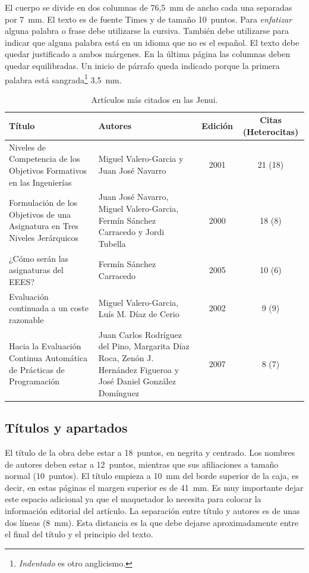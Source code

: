 \documentclass[twocolumn,twoside,a4paper, 10pt]{article}
\begin{document}
El cuerpo se divide en dos columnas de 76,5~mm de ancho cada una 
separadas por 7~mm. El texto es de fuente Times y de tamaño 10~puntos. 
Para \emph{enfatizar} alguna palabra o frase debe utilizarse la 
cursiva. También debe utilizarse para indicar que alguna palabra está 
en un idioma que no es el español. El texto debe quedar justificado a 
ambos márgenes. En la última página las columnas deben quedar 
equilibradas.
Un inicio de párrafo queda indicado porque la primera palabra está
sangrada\footnote{\emph{Indentado} es otro anglicismo.} 3,5~mm.

\begin{table}
	\begin{center}
	\begin{tabular}{p{5.2cm}p{4.5cm}cc}
		\textbf{Título} & \textbf{Autores} & \textbf{Edición} & 
		\textbf{Citas (Heterocitas)}\\\hline
		Niveles de Competencia de los Objetivos Formativos en las 
		Ingenierías & Miguel Valero-Garcia y Juan José Navarro & 2001 
		& 21 (18) \\\hline
		Formulación de los Objetivos de una Asignatura en Tres Niveles
		Jerárquicos & Juan José Navarro, Miguel Valero-Garcia, Fermín
		Sánchez Carracedo y Jordi Tubella & 2000 & 18 (8) \\\hline
		¿Cómo serán las asignaturas del EEES? & Fermín Sánchez
		Carracedo & 2005 & 10 (6) \\\hline
		Evaluación continuada a un coste razonable & Miguel
		Valero-Garcia, Luís M. Díaz de Cerio & 2002 & 9 (9) \\\hline
		Hacia la Evaluación Continua Automática de Prácticas de
		Programación & Juan Carlos Rodríguez del Pino, Margarita Díaz
		Roca, Zenón J. Hernández Figueroa y José Daniel González
		Domínguez & 2007 & 8 (7) 
	\end{tabular}
	\end{center}
	\caption{\label{tab:mascit}Artículos más citados en las Jenui.}
\end{table}

\subsection{Títulos y apartados}

El título de la obra debe estar a 18~puntos, en negrita y centrado.
Los nombres de autores deben estar a 12~puntos, mientras que sus
afiliaciones a tamaño normal (10~puntos).  El título empieza a 10~mm
del borde superior de la caja, es decir, en estas páginas el margen
superior es de 41~mm. Es muy importante dejar este espacio adicional 
ya que el maquetador lo necesita para colocar la información 
editorial del artículo.  La separación entre título y autores es de unas
dos líneas (8~mm).  Esta distancia es la que debe dejarse
aproximadamente entre el final del título y el principio del texto. 
\end{document}
